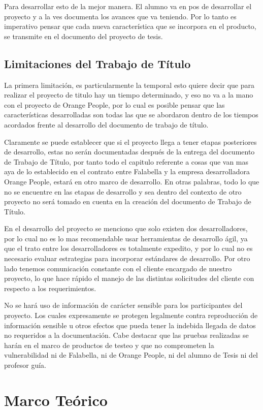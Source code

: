 \documentclass[a4paper,12pt,openany,oneside]{book}
\begin{document}
Para desarrollar esto de la mejor manera. El alumno va en pos de desarrollar el proyecto y a la ves documenta los avances que va teniendo. Por lo tanto es imperativo pensar que cada nueva característica que se incorpora en el producto, se transmite en el documento del proyecto de tesis.
\section{Limitaciones del Trabajo de Título}
La primera limitación, es particularmente la temporal esto quiere decir que para realizar el proyecto de titulo hay un tiempo determinado, y eso no va a la mano con el proyecto de Orange People, por lo cual es posible pensar que las características desarrolladas son todas las que se abordaron dentro de los tiempos acordados frente al desarrollo del documento de trabajo de título.

Claramente se puede establecer que si el proyecto llega a tener etapas posteriores de desarrollo, estas no serán documentadas después de la entrega del documento de Trabajo de Título, por tanto todo el capitulo referente a cosas que van mas aya de lo establecido en el contrato entre Falabella y la empresa desarrolladora Orange People, estará en otro marco de desarrollo. En otras palabras, todo lo que no se encuentre en las etapas de desarrollo y sea dentro del contexto de otro proyecto no será tomado en cuenta en la creación del documento de Trabajo de Título.

En el desarrollo del proyecto se menciono que solo existen dos desarrolladores, por lo cual no es lo mas recomendable usar herramientas de desarrollo ágil, ya que el trato entre los desarrolladores es totalmente expedito, y por lo cual no es necesario evaluar estrategias para incorporar estándares de desarrollo. Por otro lado tenemos comunicación constante con el cliente encargado de nuestro proyecto, lo que hace rápido el manejo de las distintas solicitudes del cliente con respecto a los requerimientos.

No se hará uso de información de carácter sensible para los participantes del proyecto. Los cuales expresamente se protegen legalmente contra reproducción de información sensible u otros efectos que pueda tener la indebida llegada de datos no requeridos a la documentación. Cabe destacar que las pruebas realizadas se harán en el marco de productos de testeo y que no comprometen la vulnerabilidad  ni de Falabella, ni de Orange People, ni del alumno de Tesis ni del profesor guía.
\chapter{Marco Teórico}
\thispagestyle{empty}
\end{document}
